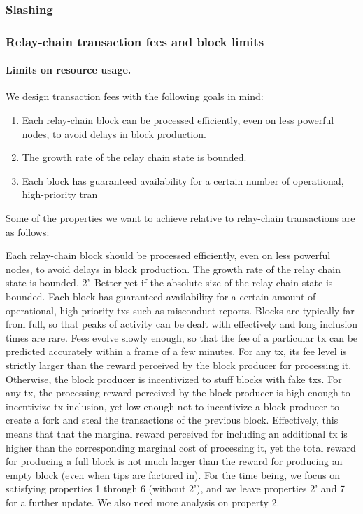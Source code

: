 \subsubsection{Slashing}

\subsubsection{Relay-chain transaction fees and block limits}

\paragraph{Limits on resource usage.} 

We design transaction fees with the following goals in mind:

\begin{enumerate}
\item Each relay-chain block can be processed efficiently, even on less powerful nodes, to avoid delays in block production.
\item The growth rate of the relay chain state is bounded.
\item Each block has guaranteed availability for a certain number of operational, high-priority tran
\end{enumerate}

Some of the properties we want to achieve relative to relay-chain transactions are as follows:

Each relay-chain block should be processed efficiently, even on less powerful nodes, to avoid delays in block production.
The growth rate of the relay chain state is bounded. 2'. Better yet if the absolute size of the relay chain state is bounded.
Each block has guaranteed availability for a certain amount of operational, high-priority txs such as misconduct reports.
Blocks are typically far from full, so that peaks of activity can be dealt with effectively and long inclusion times are rare.
Fees evolve slowly enough, so that the fee of a particular tx can be predicted accurately within a frame of a few minutes.
For any tx, its fee level is strictly larger than the reward perceived by the block producer for processing it. Otherwise, the block producer is incentivized to stuff blocks with fake txs.
For any tx, the processing reward perceived by the block producer is high enough to incentivize tx inclusion, yet low enough not to incentivize a block producer to create a fork and steal the transactions of the previous block. Effectively, this means that that the marginal reward perceived for including an additional tx is higher than the corresponding marginal cost of processing it, yet the total reward for producing a full block is not much larger than the reward for producing an empty block (even when tips are factored in).
For the time being, we focus on satisfying properties 1 through 6 (without 2'), and we leave properties 2' and 7 for a further update. We also need more analysis on property 2.

